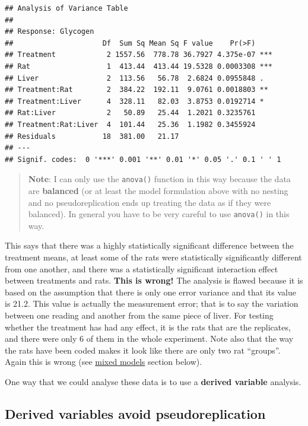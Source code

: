 \documentclass[]{book}
\theoremstyle{definition}
\theoremstyle{definition}
\theoremstyle{definition}
\theoremstyle{remark}
\begin{document}
\begin{verbatim}
## Analysis of Variance Table
## 
## Response: Glycogen
##                     Df  Sum Sq Mean Sq F value    Pr(>F)    
## Treatment            2 1557.56  778.78 36.7927 4.375e-07 ***
## Rat                  1  413.44  413.44 19.5328 0.0003308 ***
## Liver                2  113.56   56.78  2.6824 0.0955848 .  
## Treatment:Rat        2  384.22  192.11  9.0761 0.0018803 ** 
## Treatment:Liver      4  328.11   82.03  3.8753 0.0192714 *  
## Rat:Liver            2   50.89   25.44  1.2021 0.3235761    
## Treatment:Rat:Liver  4  101.44   25.36  1.1982 0.3455924    
## Residuals           18  381.00   21.17                      
## ---
## Signif. codes:  0 '***' 0.001 '**' 0.01 '*' 0.05 '.' 0.1 ' ' 1
\end{verbatim}

\begin{quote}
\textbf{Note}: I can only use the \texttt{anova()} function in this way
because the data are \textbf{balanced} (or at least the model
formulation above with no nesting and no pseudoreplication ends up
treating the data as if they were balanced). In general you have to be
very careful to use \texttt{anova()} in this way.
\end{quote}

This says that there was a highly statistically significant difference
between the treatment means, at least some of the rats were
statistically significantly different from one another, and there was a
statistically significant interaction effect between treatments and
rats. \textbf{This is wrong!} The analysis is flawed because it is based
on the assumption that there is only one error variance and that its
value is 21.2. This value is actually the measurement error; that is to
say the variation between one reading and another from the same piece of
liver. For testing whether the treatment has had any effect, it is the
rats that are the replicates, and there were only 6 of them in the whole
experiment. Note also that the way the rats have been coded makes it
look like there are only two rat ``groups''. Again this is wrong (see
\protect\hyperlink{secmixed}{mixed models} section below).

One way that we could analyse these data is to use a \textbf{derived
variable} analysis.

\subsection{Derived variables avoid
pseudoreplication}\label{derived-variables-avoid-pseudoreplication}
\end{document}
